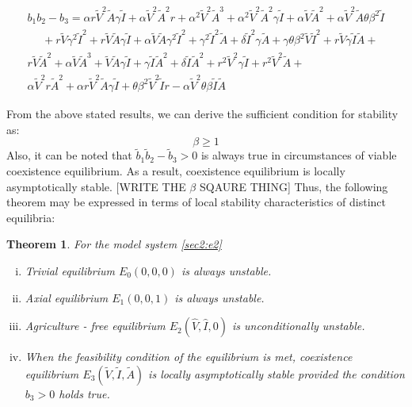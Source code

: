 \documentclass[12pt]{article}
\newtheorem{theorem}{Theorem}[section]
\numberwithin{equation}{section}
\begin{document}
\begin{enumerate}[i).]
\begin{equation}\label{sec3:e35}
\begin{split}
b_1b_2-b_3=\alpha r \tilde V^2 \tilde A \gamma \tilde I + \alpha \tilde V^2 \tilde A^2 r + \alpha^2 \tilde V^2 \tilde A^3 + \alpha^2\tilde V^2\tilde A^2\gamma \tilde I + \alpha \tilde V \tilde A^2 + \alpha \tilde V^2 \tilde A \theta \beta^2\tilde I \\
~~~~~~+ r\tilde V \gamma^2\tilde I^2 + r\tilde V\tilde A\gamma\tilde I+ \alpha \tilde V\tilde A\gamma^2\tilde I^2 + \gamma^2\tilde I^2\tilde A+\delta  \tilde I^2\gamma \tilde A
+\gamma \theta \beta^2 \tilde V \tilde I^2+ r\tilde V\gamma\tilde I \tilde A +\\
r\tilde V \tilde A^2 + \alpha \tilde V\tilde A^3+\tilde V\tilde A\gamma \tilde I+\gamma \tilde I \tilde A^2 +\delta \tilde I \tilde A^2 +r^2\tilde V^2\gamma\tilde I+r^2\tilde V^2\tilde A+\\
\alpha \tilde V^2 r \tilde A^2 + \alpha r \tilde V^2 \tilde A \gamma \tilde I+ \theta \beta^2 \tilde V^2 \tilde I r -\alpha\tilde V^2 \theta \beta \tilde I \tilde A
\end{split}
\end{equation}
\end{enumerate}

From the above stated results, we can derive the sufficient condition for stability as:
\begin{equation}\label{sec3:e36}
\beta \geq 1
\end{equation} 
Also, it can be noted that $\tilde b_1\tilde b_2-\tilde b_3>0$ is always true in circumstances of viable coexistence equilibrium. As a result, coexistence equilibrium is locally asymptotically stable. [WRITE THE $\beta$ SQAURE THING]
Thus, the following theorem may be expressed in terms of local stability characteristics of distinct equilibria:
\begin{theorem}\label{Theorem 3.4}
For the model system \eqref{sec2:e2}
\begin{enumerate}[i)]
\item Trivial equilibrium $E_0(0,0,0)$ is always unstable.
\item Axial equilibrium $E_1(0,0,1)$ is always unstable.
\item Agriculture - free equilibrium $E_2(\hat V,\hat I,0)$ is unconditionally unstable.
\item When the feasibility condition of the equilibrium is met, coexistence equilibrium $E_3(\tilde V,\tilde I,\tilde A)$ is locally asymptotically stable provided the condition $b_3>0$ holds true.
\end{enumerate}
 \end{theorem}
\end{document}
